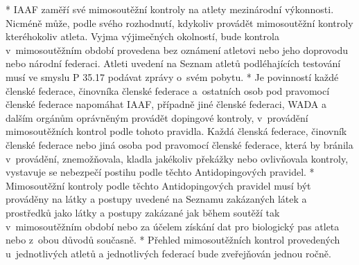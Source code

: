 * IAAF zaměří své mimosoutěžní kontroly na atlety mezinárodní výkonnosti. Nicméně může, podle svého rozhodnutí, kdykoliv provádět mimosoutěžní kontroly kteréhokoliv atleta. Vyjma výjimečných okolností, bude kontrola v~mimosoutěžním období provedena bez oznámení atletovi nebo jeho doprovodu nebo národní federaci. Atleti uvedení na Seznam atletů podléhajících testování musí ve smyslu P 35.17 podávat zprávy o~svém pobytu.
* Je povinností každé členské federace, činovníka členské federace a~ostatních osob pod pravomocí členské federace napomáhat IAAF, případně jiné členské federaci, WADA a dalším orgánům oprávněným provádět dopingové kontroly, v~provádění mimosoutěžních kontrol podle tohoto pravidla. Každá členská federace, činovník členské federace nebo jiná osoba pod pravomocí členské federace, která by bránila v~provádění, znemožňovala, kladla jakékoliv překážky nebo ovlivňovala kontroly, vystavuje se nebezpečí postihu podle těchto Antidopingových pravidel.
* Mimosoutěžní kontroly podle těchto Antidopingových pravidel musí být prováděny na látky a postupy uvedené na Seznamu zakázaných látek a prostředků jako látky a postupy zakázané jak během soutěží tak v~mimosoutěžním období nebo za účelem získání dat pro biologický pas atleta nebo z~obou důvodů současně.
* Přehled mimosoutěžních kontrol provedených u~jednotlivých atletů a jednotlivých federací bude zveřejňován jednou ročně.

